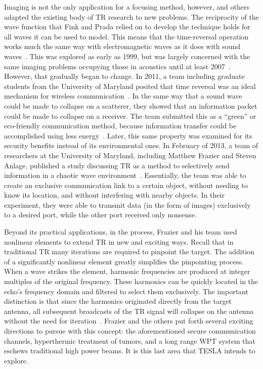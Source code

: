Imaging is not the only application for a focusing method, however, and others adapted the existing body of TR research to new problems. The reciprocity of the wave function that Fink and Prada relied on to develop the technique holds for all waves it can be used to model. This means that the time-reversal operation works much the same way with electromagnetic waves as it does with sound waves~\cite{chambers_target_2007}. This was explored as early as 1999, but was largely concerned with the same imaging problems occupying those in acoustics until at least 2007~\cite{chambers_target_2007}. However, that gradually began to change. In 2011, a team including graduate students from the University of Maryland posited that time reversal was an ideal mechanism for wireless communication~\cite{wang_green_2011}. In the same way that a sound wave could be made to collapse on a scatterer, they showed that an information packet could be made to collapse on a receiver. The team submitted this as a ``green'' or eco-friendly communication method, because information transfer could be accomplished using less energy~\cite{wang_green_2011}. Later, this same property was examined for its security benefits instead of its environmental ones. In February of 2013, a team of researchers at the University of Maryland, including Matthew Frazier and Steven Anlage, published a study discussing TR as a method to selectively send information in a chaotic wave environment~\cite{nltr-wave-chaotic,taddese_sensing_2010}. Essentially, the team was able to create an exclusive communication link to a certain object, without needing to know its location, and without interfering with nearby objects. In their experiment, they were able to transmit data (in the form of images) exclusively to a desired port, while the other port received only nonsense.

Beyond its practical applications, in the process, Frazier and his team used nonlinear elements to extend TR in new and exciting ways. Recall that in traditional TR many iterations are required to pinpoint the target. The addition of a significantly nonlinear element greatly simplifies the pinpointing process. When a wave strikes the element, harmonic frequencies are produced at integer multiples of the original frequency. These harmonics can be quickly located in the echo's frequency domain and filtered to select them exclusively. The important distinction is that since the harmonics originated directly from the target antenna, all subsequent broadcasts of the TR signal will collapse on the antenna without the need for iteration~\cite{nltr-wave-chaotic}. Frazier and the others put forth several exciting directions to pursue with this concept: the aforementioned secure communication channels, hyperthermic treatment of tumors, and a long range WPT system that eschews traditional high power beams. It is this last area that TESLA intends to explore.
